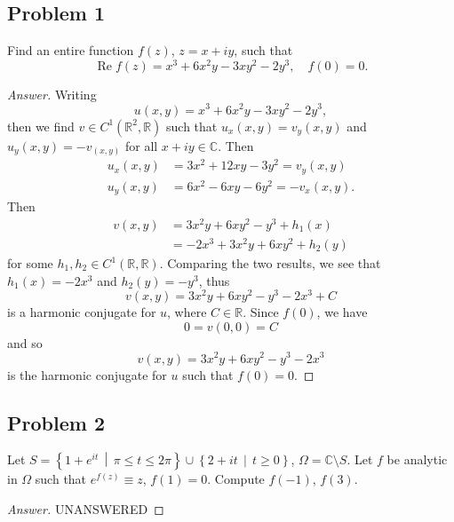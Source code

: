 \documentclass[12pt]{article}
\newcommand{\cx}{\mathbb{C}}
\newcommand{\real}{\mathbb{R}}
\newcommand\paren[1]{\left( #1 \right)}
\newcommand\setb[1]{\left \{ #1 \right \}}
\theoremstyle{definition}
\DeclareMathOperator\re{Re}
\begin{document}
\subsection{Problem 1}
Find an entire function $f(z)$, $z = x + iy$, such that 
\[
    \re f(z) = x^3 + 6x^2 y - 3xy^2 - 2y^3, \quad f(0) = 0.
\]
\begin{proof}[Answer]
    Writing 
    \[
        u(x,y) = x^3 + 6x^2 y - 3xy^2 - 2y^3,
    \]
    then we find $v \in C^1 \paren{ \real^2 , \real }$ such that $u_x(x,y) = v_y(x,y)$ and $u_y(x,y) = -v_(x,y)$ for all $x + iy \in \cx$. Then 
    \begin{align*}
        u_x(x,y) & = 3x^2 + 12xy - 3y^2 = v_y(x,y) \\
        u_y(x,y) & = 6x^2 - 6xy - 6y^2 = -v_x(x,y).
    \end{align*}
    Then
    \begin{align*}
        v(x,y) & = 3x^2y + 6xy^2 - y^3 + h_1(x) \\
        & = -2x^3 + 3x^2y + 6xy^2 + h_2(y)
    \end{align*}
    for some $h_1 , h_2 \in C^1 \paren{ \real , \real }$. Comparing the two results, we see that $h_1(x) = -2x^3$ and $h_2(y) = -y^3$, thus
    \[
        v(x,y) = 3x^2y + 6xy^2 - y^3 - 2x^3 + C
    \]
    is a harmonic conjugate for $u$, where $C \in \real$. Since $f(0)$, we have
    \[
        0 = v(0,0) = C
    \]
    and so 
    \[
         v(x,y) = 3x^2y + 6xy^2 - y^3 - 2x^3
    \]
    is the harmonic conjugate for $u$ such that $f(0) = 0$.
\end{proof}
\subsection{Problem 2}
Let $S = \setb{ 1 + e^{it} \, \middle| \, \pi \leq t \leq 2\pi } \cup \setb{ 2 + it \, \middle| \, t \geq 0 }$, $\Omega = \cx \setminus S$. Let $f$ be analytic in $\Omega$ such that $e^{f(z)} \equiv z$, $f(1) = 0$. Compute $f(-1)$, $f(3)$.
\begin{proof}[Answer]
    UNANSWERED
\end{proof}
\end{document}
